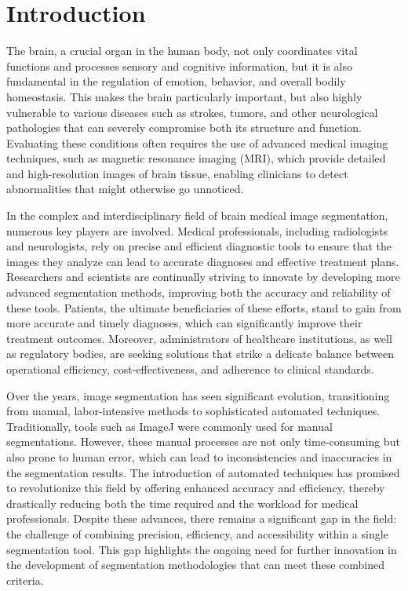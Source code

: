\documentclass{elsarticle}
\begin{document}
\linenumbers

\section{Introduction}


The brain, a crucial organ in the human body, not only coordinates vital functions and processes sensory and cognitive information, but it is also fundamental in the regulation of emotion, behavior, and overall bodily homeostasis. This makes the brain particularly important, but also highly vulnerable to various diseases such as strokes, tumors, and other neurological pathologies that can severely compromise both its structure and function. Evaluating these conditions often requires the use of advanced medical imaging techniques, such as magnetic resonance imaging (MRI), which provide detailed and high-resolution images of brain tissue, enabling clinicians to detect abnormalities that might otherwise go unnoticed.

In the complex and interdisciplinary field of brain medical image segmentation, numerous key players are involved. Medical professionals, including radiologists and neurologists, rely on precise and efficient diagnostic tools to ensure that the images they analyze can lead to accurate diagnoses and effective treatment plans. Researchers and scientists are continually striving to innovate by developing more advanced segmentation methods, improving both the accuracy and reliability of these tools. Patients, the ultimate beneficiaries of these efforts, stand to gain from more accurate and timely diagnoses, which can significantly improve their treatment outcomes. Moreover, administrators of healthcare institutions, as well as regulatory bodies, are seeking solutions that strike a delicate balance between operational efficiency, cost-effectiveness, and adherence to clinical standards.

Over the years, image segmentation has seen significant evolution, transitioning from manual, labor-intensive methods to sophisticated automated techniques. Traditionally, tools such as ImageJ were commonly used for manual segmentations. However, these manual processes are not only time-consuming but also prone to human error, which can lead to inconsistencies and inaccuracies in the segmentation results. The introduction of automated techniques has promised to revolutionize this field by offering enhanced accuracy and efficiency, thereby drastically reducing both the time required and the workload for medical professionals. Despite these advances, there remains a significant gap in the field: the challenge of combining precision, efficiency, and accessibility within a single segmentation tool. This gap highlights the ongoing need for further innovation in the development of segmentation methodologies that can meet these combined criteria.
\end{document}
